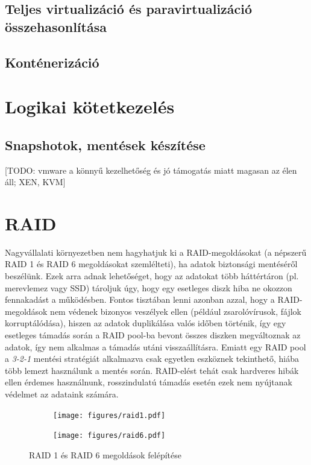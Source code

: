 \subsection{Teljes virtualizáció és paravirtualizáció összehasonlítása}
\subsection{Konténerizáció}

\section{Logikai kötetkezelés}
\subsection{Snapshotok, mentések készítése}




[TODO: vmware a könnyű kezelhetőség és jó támogatás miatt magasan az élen áll; XEN, KVM]


\section{RAID}
Nagyvállalati környezetben nem hagyhatjuk ki a RAID-megoldásokat (a népszerű RAID 1 és RAID 6 megoldásokat  szemlélteti), ha adatok biztonsági mentéséről beszélünk. Ezek arra adnak lehetőséget, hogy az adatokat több háttértáron (pl. merevlemez vagy SSD) tároljuk úgy, hogy egy esetleges diszk hiba ne okozzon fennakadást a működésben. Fontos tisztában lenni azonban azzal, hogy a RAID-megoldások nem védenek bizonyos veszélyek ellen (például zsarolóvírusok, fájlok korruptálódása), hiszen az adatok duplikálása valós időben történik, így egy esetleges támadás során a RAID pool-ba bevont összes diszken megváltoznak az adatok, így nem alkalmas a támadás utáni visszaállításra. Emiatt egy RAID pool a \textit{3-2-1} mentési stratégiát alkalmazva csak egyetlen eszköznek tekinthető, hiába több lemezt használunk a mentés során. RAID-elést tehát csak hardveres hibák ellen érdemes használnunk, rosszindulatú támadás esetén ezek nem nyújtanak védelmet az adataink számára.

\begin{figure}[!ht]
	
	\centering
	\begin{subfigure}{0.3\textwidth}
		\centering
		\texttt{[image: figures/raid1.pdf]}
	\end{subfigure}
	\hspace{0.05\textwidth}
	\begin{subfigure}{0.6\textwidth}
		\centering
		\texttt{[image: figures/raid6.pdf]}
	\end{subfigure}
	\caption{RAID 1 és RAID 6 megoldások felépítése \cite{WikiRaidLevels}}
	\label{fig:raid}
\end{figure}


